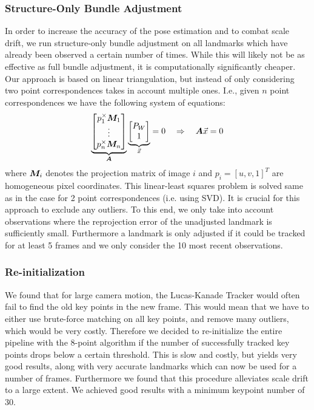\documentclass[11pt]{article}
\newcommand{\mat}{\matrixsym}
\begin{document}
\subsubsection{Structure-Only Bundle Adjustment}
In order to increase the accuracy of the pose estimation and to combat scale drift, we run structure-only bundle adjustment on all landmarks which have already been observed a certain number of times. While this will likely not be as effective as full bundle adjustment, it is computationally significantly cheaper.\\
Our approach is based on linear triangulation, but instead of only considering two point correspondences takes in account multiple ones. I.e., given $n$ point correspondences we have the following system of equations:
\begin{equation*}
\underbrace{\begin{bmatrix} p_1^\times \mat{M}_1\\ \vdots \\ p_n^\times \mat{M}_n \end{bmatrix}}_{\mat{A}} \underbrace{\begin{bmatrix} P_W \\ 1 \end{bmatrix}}_{\vec{x}} = 0 \quad \Rightarrow \quad \mat{A} \vec{x} = 0
\end{equation*}
where $\mat{M}_i$ denotes the projection matrix of image $i$ and $p_i = [u,v,1]^T$ are homogeneous pixel coordinates. This linear-least squares problem is solved same as in the case for 2 point correspondences (i.e. using SVD). It is crucial for this approach to exclude any outliers. To this end, we only take into account observations where the reprojection error of the unadjusted landmark is sufficiently small. Furthermore a landmark is only adjusted if it could be tracked for at least 5 frames and we only consider the 10 most recent observations.

\subsubsection{Re-initialization}
We found that for large camera motion, the Lucas-Kanade Tracker would often fail to find the old key points in the new frame. This would mean that we have to either use brute-force matching on all key points, and remove many outliers, which would be very costly. Therefore we decided to re-initialize the entire pipeline with the 8-point algorithm if the number of successfully tracked key points drops below a certain threshold. This is slow and costly, but yields very good results, along with very accurate landmarks which can now be used for a number of frames. Furthermore we found that this procedure alleviates scale drift to a large extent. We achieved good results with a minimum keypoint number of 30. 
\end{document}
